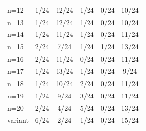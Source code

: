 \begin{tabular}{lccccc}
n=12 & \cellcolor[HTML]{FFFFFF} 1/24 & \cellcolor[HTML]{EA4646} 12/24 & \cellcolor[HTML]{9670BD} 1/24 & \cellcolor[HTML]{8FEB32} 0/24 & \cellcolor[HTML]{19C8C8} 10/24 \\
n=13 & \cellcolor[HTML]{FFFFFF} 1/24 & \cellcolor[HTML]{EA4646} 12/24 & \cellcolor[HTML]{9670BD} 1/24 & \cellcolor[HTML]{8FEB32} 0/24 & \cellcolor[HTML]{19C8C8} 10/24 \\
n=14 & \cellcolor[HTML]{FFFFFF} 1/24 & \cellcolor[HTML]{EA4646} 11/24 & \cellcolor[HTML]{9670BD} 1/24 & \cellcolor[HTML]{8FEB32} 0/24 & \cellcolor[HTML]{19C8C8} 11/24 \\
n=15 & \cellcolor[HTML]{FFFFFF} 2/24 & \cellcolor[HTML]{EA4646} 7/24 & \cellcolor[HTML]{9670BD} 1/24 & \cellcolor[HTML]{8FEB32} 1/24 & \cellcolor[HTML]{19C8C8} 13/24 \\
n=16 & \cellcolor[HTML]{FFFFFF} 2/24 & \cellcolor[HTML]{EA4646} 11/24 & \cellcolor[HTML]{9670BD} 0/24 & \cellcolor[HTML]{8FEB32} 0/24 & \cellcolor[HTML]{19C8C8} 11/24 \\
n=17 & \cellcolor[HTML]{FFFFFF} 1/24 & \cellcolor[HTML]{EA4646} 13/24 & \cellcolor[HTML]{9670BD} 1/24 & \cellcolor[HTML]{8FEB32} 0/24 & \cellcolor[HTML]{19C8C8} 9/24 \\
n=18 & \cellcolor[HTML]{FFFFFF} 1/24 & \cellcolor[HTML]{EA4646} 10/24 & \cellcolor[HTML]{9670BD} 2/24 & \cellcolor[HTML]{8FEB32} 0/24 & \cellcolor[HTML]{19C8C8} 11/24 \\
n=19 & \cellcolor[HTML]{FFFFFF} 1/24 & \cellcolor[HTML]{EA4646} 9/24 & \cellcolor[HTML]{9670BD} 3/24 & \cellcolor[HTML]{8FEB32} 0/24 & \cellcolor[HTML]{19C8C8} 11/24 \\
n=20 & \cellcolor[HTML]{FFFFFF} 2/24 & \cellcolor[HTML]{EA4646} 4/24 & \cellcolor[HTML]{9670BD} 5/24 & \cellcolor[HTML]{8FEB32} 0/24 & \cellcolor[HTML]{19C8C8} 13/24 \\
variant & \cellcolor[HTML]{FFFFFF} 6/24 & \cellcolor[HTML]{EA4646} 2/24 & \cellcolor[HTML]{9670BD} 1/24 & \cellcolor[HTML]{8FEB32} 0/24 & \cellcolor[HTML]{19C8C8} 15/24 \\
\bottomrule
\end{tabular}
